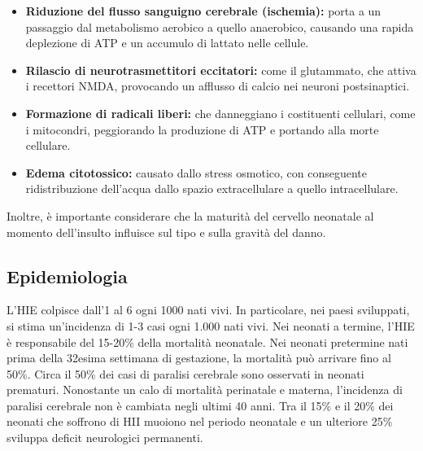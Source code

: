 \begin{itemize}
	\tightlist
	\item
	\textbf{Riduzione del flusso sanguigno cerebrale (ischemia):} porta a un passaggio dal metabolismo aerobico a quello anaerobico, causando una rapida deplezione di ATP e un accumulo di lattato nelle cellule.
	\item
	\textbf{Rilascio di neurotrasmettitori eccitatori:} come il glutammato, che attiva i recettori NMDA, provocando un afflusso di calcio nei neuroni postsinaptici.
	\item
	\textbf{Formazione di radicali liberi:} che danneggiano i costituenti cellulari, come i mitocondri, peggiorando la produzione di ATP e portando alla morte cellulare.
	\item
	\textbf{Edema citotossico:} causato dallo stress osmotico, con conseguente ridistribuzione dell'acqua dallo spazio extracellulare a quello intracellulare.
\end{itemize}

Inoltre, è importante considerare che la maturità del cervello neonatale al momento dell'insulto influisce sul tipo e sulla gravità del danno.

\subsection{Epidemiologia}

L'HIE colpisce dall'1 al 6 ogni 1000 nati vivi. In particolare, nei paesi sviluppati, si stima un'incidenza di 1-3 casi ogni 1.000 nati vivi. Nei neonati a termine, l'HIE è responsabile del 15-20\% della mortalità neonatale. Nei neonati pretermine nati prima della 32esima settimana di gestazione, la mortalità può arrivare fino al 50\%. Circa il 50\% dei casi di paralisi cerebrale sono osservati in neonati prematuri. Nonostante un calo di mortalità perinatale e materna, l'incidenza di paralisi cerebrale non è cambiata negli ultimi 40 anni. Tra il 15\% e il 20\% dei neonati che soffrono di HII muoiono nel periodo neonatale e un ulteriore 25\% sviluppa deficit neurologici permanenti.


